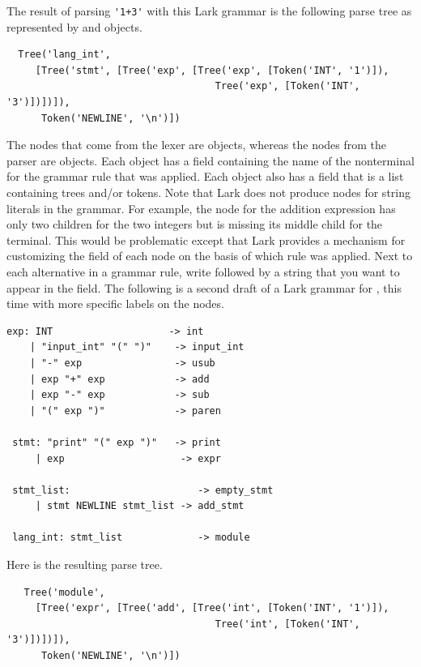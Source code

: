 \documentclass[7x10]{TimesAPriori_MIT}%
\numberwithin{theorem}{chapter}
\numberwithin{definition}{chapter}
\numberwithin{equation}{chapter}
\begin{document}
{The result of parsing \lstinline{'1+3'} with this Lark grammar is the
following parse tree as represented by  and 
objects.
\begin{lstlisting}
  Tree('lang_int',
     [Tree('stmt', [Tree('exp', [Tree('exp', [Token('INT', '1')]),
                                    Tree('exp', [Token('INT', '3')])])]),
      Token('NEWLINE', '\n')])
\end{lstlisting}
The nodes that come from the lexer are  objects, whereas
the nodes from the parser are  objects.  Each 
object has a  field containing the name of the nonterminal
for the grammar rule that was applied. Each  object also
has a  field that is a list containing trees and/or
tokens. Note that Lark does not produce nodes for string literals in
the grammar. For example, the  node for the addition
expression has only two children for the two integers but is missing
its middle child for the  terminal. This would be
problematic except that Lark provides a mechanism for customizing the
 field of each  node on the basis of which rule was
applied.  Next to each alternative in a grammar rule, write \code{->}
followed by a string that you want to appear in the 
field.  The following is a second draft of a Lark grammar for
\LangInt{}, this time with more specific labels on the 
nodes.
\begin{center}
\begin{minipage}{0.95\textwidth}
\begin{lstlisting}[escapechar=$]
 exp: INT                    -> int
    | "input_int" "(" ")"    -> input_int
    | "-" exp                -> usub
    | exp "+" exp            -> add
    | exp "-" exp            -> sub
    | "(" exp ")"            -> paren

 stmt: "print" "(" exp ")"   -> print
     | exp                    -> expr

 stmt_list:                      -> empty_stmt
     | stmt NEWLINE stmt_list -> add_stmt

 lang_int: stmt_list             -> module
\end{lstlisting}
\end{minipage}
\end{center}
Here is the resulting parse tree. 
\begin{lstlisting}
   Tree('module',
     [Tree('expr', [Tree('add', [Tree('int', [Token('INT', '1')]),
                                    Tree('int', [Token('INT', '3')])])]),
      Token('NEWLINE', '\n')])
\end{lstlisting}

}
\end{document}
